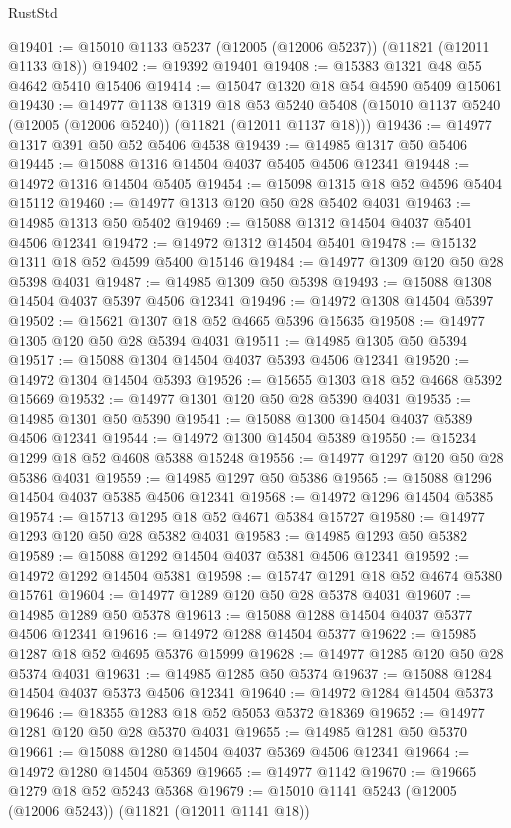 \begin{lexlean}{RustStd}
\begin{coremodule}
@19401 := @15010 @1133 @5237 (@12005 (@12006 @5237)) (@11821 (@12011 @1133 @18))
@19402 := @19392 @19401
@19408 := @15383 @1321 @48 @55 @4642 @5410 @15406
@19414 := @15047 @1320 @18 @54 @4590 @5409 @15061
@19430 := @14977
    @1138
    @1319
    @18
    @53
    @5240
    @5408
    (@15010 @1137 @5240 (@12005 (@12006 @5240)) (@11821 (@12011 @1137 @18)))
@19436 := @14977 @1317 @391 @50 @52 @5406 @4538
@19439 := @14985 @1317 @50 @5406
@19445 := @15088 @1316 @14504 @4037 @5405 @4506 @12341
@19448 := @14972 @1316 @14504 @5405
@19454 := @15098 @1315 @18 @52 @4596 @5404 @15112
@19460 := @14977 @1313 @120 @50 @28 @5402 @4031
@19463 := @14985 @1313 @50 @5402
@19469 := @15088 @1312 @14504 @4037 @5401 @4506 @12341
@19472 := @14972 @1312 @14504 @5401
@19478 := @15132 @1311 @18 @52 @4599 @5400 @15146
@19484 := @14977 @1309 @120 @50 @28 @5398 @4031
@19487 := @14985 @1309 @50 @5398
@19493 := @15088 @1308 @14504 @4037 @5397 @4506 @12341
@19496 := @14972 @1308 @14504 @5397
@19502 := @15621 @1307 @18 @52 @4665 @5396 @15635
@19508 := @14977 @1305 @120 @50 @28 @5394 @4031
@19511 := @14985 @1305 @50 @5394
@19517 := @15088 @1304 @14504 @4037 @5393 @4506 @12341
@19520 := @14972 @1304 @14504 @5393
@19526 := @15655 @1303 @18 @52 @4668 @5392 @15669
@19532 := @14977 @1301 @120 @50 @28 @5390 @4031
@19535 := @14985 @1301 @50 @5390
@19541 := @15088 @1300 @14504 @4037 @5389 @4506 @12341
@19544 := @14972 @1300 @14504 @5389
@19550 := @15234 @1299 @18 @52 @4608 @5388 @15248
@19556 := @14977 @1297 @120 @50 @28 @5386 @4031
@19559 := @14985 @1297 @50 @5386
@19565 := @15088 @1296 @14504 @4037 @5385 @4506 @12341
@19568 := @14972 @1296 @14504 @5385
@19574 := @15713 @1295 @18 @52 @4671 @5384 @15727
@19580 := @14977 @1293 @120 @50 @28 @5382 @4031
@19583 := @14985 @1293 @50 @5382
@19589 := @15088 @1292 @14504 @4037 @5381 @4506 @12341
@19592 := @14972 @1292 @14504 @5381
@19598 := @15747 @1291 @18 @52 @4674 @5380 @15761
@19604 := @14977 @1289 @120 @50 @28 @5378 @4031
@19607 := @14985 @1289 @50 @5378
@19613 := @15088 @1288 @14504 @4037 @5377 @4506 @12341
@19616 := @14972 @1288 @14504 @5377
@19622 := @15985 @1287 @18 @52 @4695 @5376 @15999
@19628 := @14977 @1285 @120 @50 @28 @5374 @4031
@19631 := @14985 @1285 @50 @5374
@19637 := @15088 @1284 @14504 @4037 @5373 @4506 @12341
@19640 := @14972 @1284 @14504 @5373
@19646 := @18355 @1283 @18 @52 @5053 @5372 @18369
@19652 := @14977 @1281 @120 @50 @28 @5370 @4031
@19655 := @14985 @1281 @50 @5370
@19661 := @15088 @1280 @14504 @4037 @5369 @4506 @12341
@19664 := @14972 @1280 @14504 @5369
@19665 := @14977 @1142
@19670 := @19665 @1279 @18 @52 @5243 @5368
@19679 := @15010 @1141 @5243 (@12005 (@12006 @5243)) (@11821 (@12011 @1141 @18))

\end{coremodule}
\end{lexlean}
